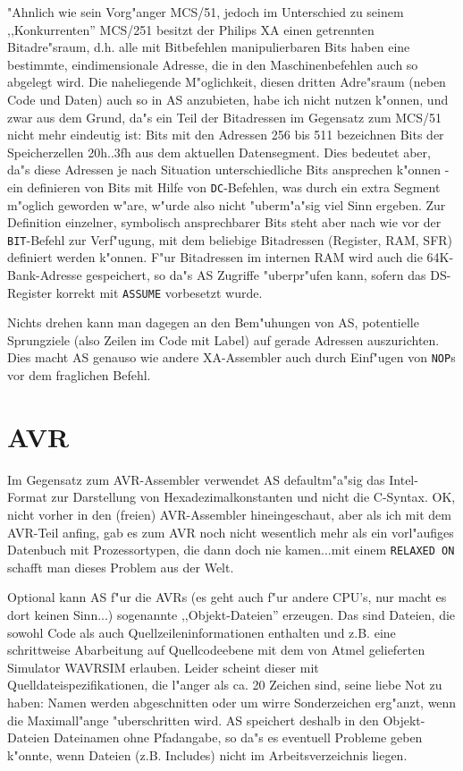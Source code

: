 \documentclass[12pt,a4paper,twoside]{report}
\newcommand{\tty}[1]{{\tt #1}}
\begin{document}
"Ahnlich wie sein Vorg"anger MCS/51, jedoch im Unterschied zu seinem
,,Konkurrenten'' MCS/251 besitzt der Philips XA einen getrennten Bitadre"sraum,
d.h. alle mit Bitbefehlen manipulierbaren Bits haben eine
bestimmte, eindimensionale Adresse, die in den Maschinenbefehlen auch
so abgelegt wird.  Die naheliegende M"oglichkeit, diesen dritten
Adre"sraum (neben Code und Daten) auch so in AS anzubieten, habe ich
nicht nutzen k"onnen, und zwar aus dem Grund, da"s ein Teil der Bitadressen
im Gegensatz zum MCS/51 nicht mehr eindeutig ist: Bits mit
den Adressen 256 bis 511 bezeichnen Bits der Speicherzellen 20h..3fh
aus dem aktuellen Datensegment.  Dies bedeutet aber, da"s diese Adressen
je nach Situation unterschiedliche Bits ansprechen k"onnen - ein definieren
von Bits mit Hilfe von \tty{DC}-Befehlen, was durch ein extra Segment
m"oglich geworden w"are, w"urde also nicht "uberm"a"sig viel Sinn ergeben.
Zur Definition einzelner, symbolisch ansprechbarer Bits steht aber
nach wie vor der \tty{BIT}-Befehl zur Verf"ugung, mit dem beliebige Bitadressen
(Register, RAM, SFR) definiert werden k"onnen.  F"ur Bitadressen im
internen RAM wird auch die 64K-Bank-Adresse gespeichert, so da"s AS
Zugriffe "uberpr"ufen kann, sofern das DS-Register korrekt mit \tty{ASSUME}
vorbesetzt wurde.
\par
Nichts drehen kann man dagegen an den Bem"uhungen von AS, potentielle
Sprungziele (also Zeilen im Code mit Label) auf gerade Adressen
auszurichten.  Dies macht AS genauso wie andere XA-Assembler auch durch
Einf"ugen von \tty{NOP}s vor dem fraglichen Befehl.


\section{AVR}

Im Gegensatz zum AVR-Assembler verwendet AS defaultm"a"sig das Intel-Format
zur Darstellung von Hexadezimalkonstanten und nicht die C-Syntax.  OK, nicht
vorher in den (freien) AVR-Assembler hineingeschaut, aber als ich mit dem
AVR-Teil anfing, gab es zum AVR noch nicht wesentlich mehr als ein
vorl"aufiges Datenbuch mit Prozessortypen, die dann doch nie kamen...mit
einem \tty{RELAXED ON} schafft man dieses Problem aus der Welt.

Optional kann AS f"ur die AVRs (es geht auch f"ur andere CPU's, nur
macht es dort keinen Sinn...) sogenannte ,,Objekt-Dateien'' erzeugen.
Das sind Dateien, die sowohl Code als auch Quellzeileninformationen
enthalten und z.B. eine schrittweise Abarbeitung auf Quellcodeebene
mit dem von Atmel gelieferten Simulator WAVRSIM erlauben.  Leider
scheint dieser mit Quelldateispezifikationen, die l"anger als ca. 20
Zeichen sind, seine liebe Not zu haben: Namen werden abgeschnitten
oder um wirre Sonderzeichen erg"anzt, wenn die Maximall"ange "uberschritten
wird.  AS speichert deshalb in den Objekt-Dateien Dateinamen ohne
Pfadangabe, so da"s es eventuell Probleme geben k"onnte, wenn
Dateien (z.B. Includes) nicht im Arbeitsverzeichnis liegen.
\end{document}
